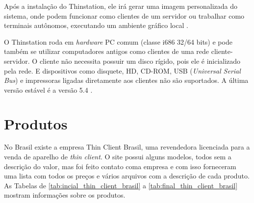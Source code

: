 \documentclass[
	12pt,				%
	openright,			%
	twoside,			%
	a4paper,			%
	chapter=TITLE,		%
	english,			%
	brazil				%
	]{abntex2}
\begin{document}
Após a instalação do Thinstation, ele irá gerar uma imagem personalizada do sistema, onde podem funcionar como clientes de um servidor ou trabalhar como terminais autônomos, executando um ambiente gráfico local \cite{Thinstationl}.

O Thinstation roda em \textit{hardware} PC comum (classe i686 32/64 bits) e pode também se utilizar computadores antigos como clientes de uma rede cliente-servidor. O cliente não necessita possuir um disco rígido, pois ele é inicializado pela rede. E dispositivos como disquete, HD, CD-ROM, USB (\textit{Universal Serial Bus}) e impressoras ligadas diretamente aos clientes não são suportados. A última versão estável é a versão 5.4 \cite{Thinstationl,piaui}.


\section{Produtos}

No Brasil existe a empresa Thin Client Brasil, uma revendedora licenciada para a venda de aparelho de \textit{thin client}. O site possui alguns modelos, todos sem a descrição do valor, mas foi feito contato coma empresa e com isso forneceram uma lista com todos os preços e vários arquivos com a descrição de cada produto. As Tabelas de \ref{tab:incial_thin_client_brasil} a \ref{tab:final_thin_client_brasil} mostram informações sobre os produtos.

 
\newpage

 \begin{table}[h!]
\end{table}
 
\end{document}
